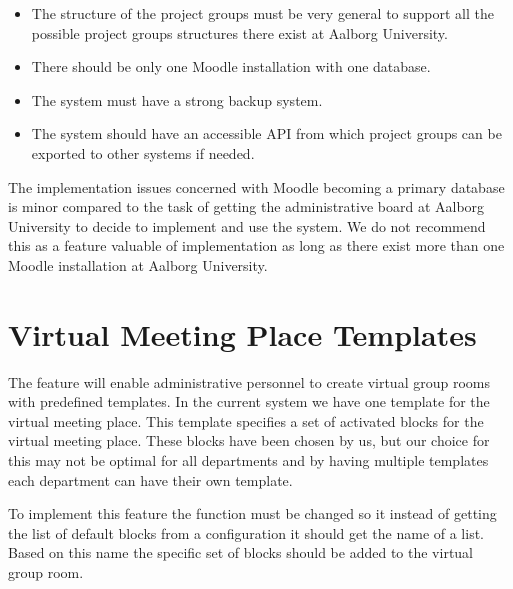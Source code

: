 \begin{itemize}
	\item The structure of the project groups must be very general to support all the possible project groups structures there exist at Aalborg University. 
	\item There should be only one Moodle installation with one database. 
	\item The system must have a strong backup system.
	\item The system should have an accessible API from which project groups can be exported to other systems if needed. 
\end{itemize}

The implementation issues concerned with Moodle becoming a primary database is minor compared to the task of getting the administrative board at Aalborg University to decide to implement and use the system. 
We do not recommend this as a feature valuable of implementation as long as there exist more than one Moodle installation at Aalborg University. 


\section{Virtual Meeting Place Templates} 
\label{sec:templates}
The feature will enable administrative personnel to create virtual group rooms with predefined templates.
In the current system we have one template for the virtual meeting place. 
This template specifies a set of activated blocks for the virtual meeting place. 
These blocks have been chosen by us, but our choice for this may not be optimal for all departments and by having multiple templates each department can have their own template.

To implement this feature the function  must be changed so it instead of getting the list of default blocks from a configuration it should get the name of a list.
Based on this name the specific set of blocks should be added to the virtual group room.

